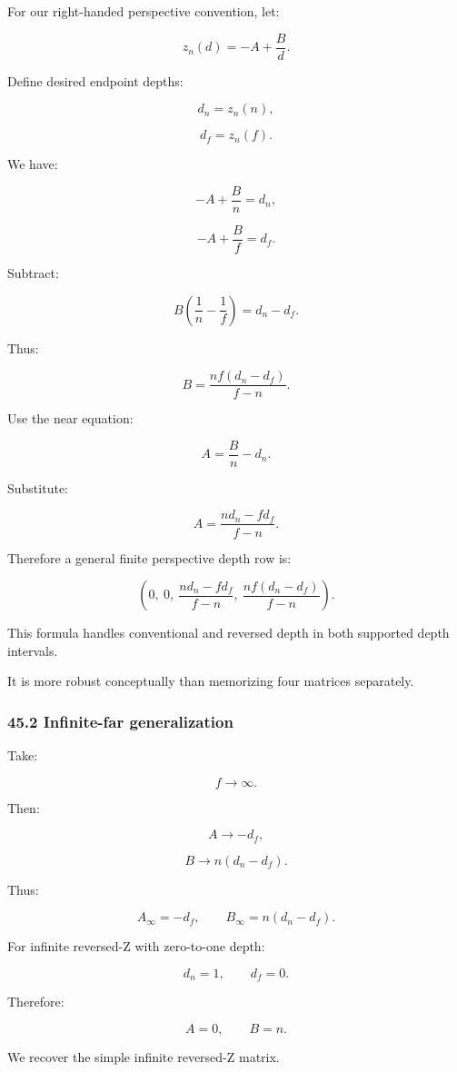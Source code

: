 For our right-handed perspective convention, let:

\[
 z_n(d)=-A+\frac Bd.
\]

Define desired endpoint depths:

\[
 d_n=z_n(n),
\]

\[
 d_f=z_n(f).
\]

We have:

\[
 -A+\frac Bn=d_n,
\]

\[
 -A+\frac Bf=d_f.
\]

Subtract:

\[
 B\left(\frac1n-\frac1f\right)=d_n-d_f.
\]

Thus:

\[
 \boxed{ B=\frac{nf(d_n-d_f)}{f-n} }.
\]

Use the near equation:

\[
 A=\frac Bn-d_n.
\]

Substitute:

\[
 \boxed{ A=\frac{nd_n-fd_f}{f-n} }.
\]

Therefore a general finite perspective depth row is:

\[
 \boxed{ \left( 0,\ 0,\ \frac{nd_n-fd_f}{f-n},\ \frac{nf(d_n-d_f)}{f-n} \right) }.
\]

This formula handles conventional and reversed depth in both supported depth intervals.

It is more robust conceptually than memorizing four matrices separately.

\subsubsection{45.2 Infinite-far generalization}\label{infinite-far-generalization}

Take:

\[
 f\to\infty.
\]

Then:

\[
 A\to-d_f,
\]

\[
 B\to n(d_n-d_f).
\]

Thus:

\[
 \boxed{ A_{\infty}=-d_f, \qquad B_{\infty}=n(d_n-d_f) }.
\]

For infinite reversed-Z with zero-to-one depth:

\[
 d_n=1,\qquad d_f=0.
\]

Therefore:

\[
 A=0,\qquad B=n.
\]

We recover the simple infinite reversed-Z matrix.

